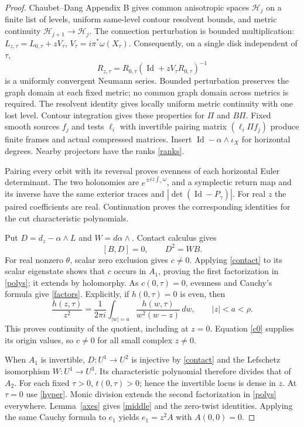 \documentclass[11pt]{article}
\newcommand{\Id}{\operatorname{Id}}
\begin{document}
\begin{proof}
Chaubet--Dang Appendix B gives common anisotropic spaces
$\mathcal H_j$ on a finite list of levels, uniform same-level contour
resolvent bounds, and metric continuity $\mathcal H_{j+1}\to\mathcal H_j$.
The connection perturbation is bounded multiplication:
$L_{z,\tau}=L_{0,\tau}+zV_\tau$, $V_\tau=i\pi^*\omega(X_\tau)$.
Consequently, on a single disk independent of $\tau$,
\begin{equation}\label{neumann}
 R_{z,\tau}=R_{0,\tau}(\Id+zV_\tau R_{0,\tau})^{-1}
\end{equation}
is a uniformly convergent Neumann series. Bounded perturbation preserves
the graph domain at each fixed metric; no common graph domain across
metrics is required. The resolvent identity gives locally uniform metric
continuity with one lost level. Contour integration gives these properties
for $\Pi$ and $B\Pi$. Fixed smooth sources $f_j$ and tests $\ell_i$ with
invertible pairing matrix $(\ell_i\Pi f_j)$ produce finite frames and
actual compressed matrices. Insert $\Id-\alpha\wedge\iota_X$ for
horizontal degrees. Nearby projectors have the ranks \eqref{ranks}.

Pairing every orbit with its reversal proves evenness of each horizontal
Euler determinant. The two holonomies are $e^{\pm iz\int_\gamma\omega}$,
and a symplectic return map and its inverse have the same exterior traces
and $|\det(\Id-P_\gamma)|$. For real $z$ the paired coefficients are
real. Continuation proves the corresponding identities for the cut
characteristic polynomials.

Put $D=d_z-\alpha\wedge L$ and $W=d\alpha\wedge$. Contact calculus gives
\begin{equation}\label{contact}
 [B,D]=0,\qquad D^2=WB.
\end{equation}
For real nonzero $\theta$, scalar zero exclusion
\cite[Lemma 7.4]{DGRS} gives $c\ne0$. Applying \eqref{contact} to its
scalar eigenstate shows that $c$ occurs in $A_1$, proving the first
factorization in \eqref{polys}; it extends by holomorphy. As $c(0,\tau)=0$,
evenness and Cauchy's formula give \eqref{factors}. Explicitly, if
$h(0,\tau)=0$ is even, then
\[
 \frac{h(z,\tau)}{z^2}=\frac1{2\pi i}\int_{|w|=a}
             \frac{h(w,\tau)}{w^2(w-z)}\,dw,\qquad |z|<a<\rho.
\]
This proves continuity of the quotient, including at $z=0$.
Equation \eqref{c0} supplies its origin values, so $c\ne0$ for all
small complex $z\ne0$.

When $A_1$ is invertible, $D:U^1\to U^2$ is injective by
\eqref{contact} and the Lefschetz isomorphism $W:U^1\to U^3$.
Its characteristic polynomial therefore divides that of $A_2$.
For each fixed $\tau>0$, $t(0,\tau)>0$; hence the invertible locus
is dense in $z$. At $\tau=0$ use \eqref{hyper}. Monic division extends
the second factorization in \eqref{polys} everywhere. Lemma~\ref{axes}
gives \eqref{middle} and the zero-twist identities. Applying the same
Cauchy formula to $e_1$ yields $e_1=z^2A$ with $A(0,0)=0$.
\end{proof}
\end{document}
